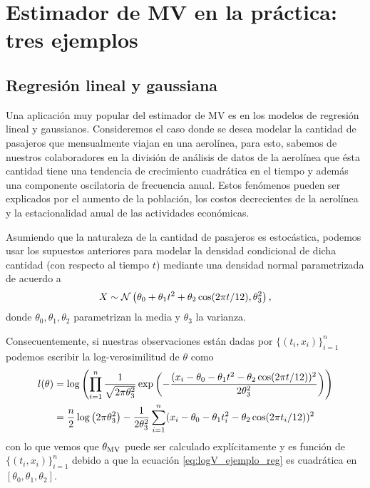 
\section{Estimador de MV en la práctica: tres ejemplos} %
\label{sub:MV_tres_ejemplos}

\subsection{Regresión lineal y gaussiana} 
\label{sub:reg_lin}


Una aplicación muy popular del estimador de MV es en los modelos de regresión lineal y gaussianos. Consideremos el caso donde se desea modelar la cantidad de pasajeros que mensualmente viajan en una aerolínea, para esto, sabemos de nuestros colaboradores en la división de análisis de datos de la aerolínea que ésta cantidad tiene una tendencia de crecimiento cuadrática en el tiempo y además una componente oscilatoria de frecuencia anual. Estos fenómenos pueden ser explicados por el aumento de la población, los costos decrecientes de la aerolínea y la estacionalidad anual de las actividades económicas. 

Asumiendo que la naturaleza de la cantidad de pasajeros es estocástica, podemos usar los supuestos anteriores para modelar la densidad condicional  de dicha cantidad (con respecto al tiempo $t$) mediante una densidad normal parametrizada de acuerdo a 
\begin{equation}
	X \sim {\mathcal N}\left(\theta_0 + \theta_1 t^2 + \theta_2\cos(2\pi t/12), \theta_3^2\right),
\end{equation}
donde $\theta_0,\theta_1,\theta_2$ parametrizan la media y $\theta_3$ la varianza. 

Consecuentemente, si nuestras observaciones están dadas por $\{(t_i,x_i)\}_{i=1}^n$ podemos escribir la log-verosimilitud de $\theta$ como 
\begin{align}
	\label{eq:logV_ejemplo_reg}
	l(\theta) 	&=\log\left(\prod_{i=1}^n \frac{1}{\sqrt{2\pi\theta_3^2}}\exp\left(-\frac{(x_i-\theta_0 - \theta_1 t^2 - \theta_2\cos(2\pi t/12))^2}{2\theta_3^2}\right)\right)\nonumber \\
	&=\frac{n}{2}\log\left(2\pi\theta_3^2\right)  - \frac{1}{2\theta_3^2}\sum_{i=1}^n (x_i - \theta_0 - \theta_1 t_i^2 - \theta_2\cos(2\pi t_i/12))^2
\end{align}
con lo que vemos que ${\theta_\text{MV}}$ puede ser calculado explícitamente y es función de $\{(t_i,x_i)\}_{i=1}^n$ debido a que la ecuación \eqref{eq:logV_ejemplo_reg} es cuadrática en $[\theta_0,\theta_1,	\theta_2]$.


